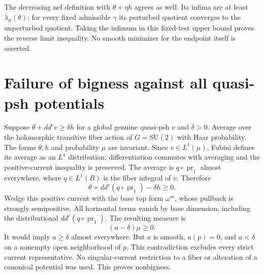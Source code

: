\documentclass[11pt]{article}
\newcommand{\ddc}{dd^c}
\theoremstyle{remark}\newtheorem{remark}[theorem]{Remark}
\begin{document}
The decreasing nef definition with $\theta+\eta h$ agrees as well.
Its infima are at least $\lambda_\mu(\theta)$; for every fixed admissible
$\gamma$ its perturbed quotient converges to the unperturbed quotient.
Taking the infimum in this fixed-test upper bound proves the reverse limit
inequality. No smooth minimizer for the endpoint itself is asserted.

\section{Failure of bigness against all quasi-psh potentials}
Suppose $\theta+\ddc v\geq\delta h$ for a global genuine quasi-psh $v$
and $\delta>0$. Average over the holomorphic transitive fiber action
of $G=\mathrm{SU}(2)$ with Haar probability. The forms $\theta,h$ and
probability $\mu$ are invariant. Since $v\in L^1(\mu)$, Fubini defines
its average as an $L^1$ distribution; differentiation commutes with averaging
and the positive-current inequality is preserved.
The average is $q\circ\operatorname{pr}_1$ almost everywhere, where
$q\in L^1(B)$ is the fiber integral of $v$. Therefore
\[
 \theta+\ddc(q\circ\operatorname{pr}_1)-\delta h\geq0.
\]
Wedge this positive current with the base top form $\omega^m$, whose
pullback is strongly semipositive. All horizontal terms vanish by base dimension, including the
distributional $\ddc(q\circ\operatorname{pr}_1)$. The resulting measure is
\[
 (a-\delta)\mu\geq0.
\]
It would imply $a\geq\delta$ almost everywhere. But $a$ is smooth,
$a(p)=0$, and $a<\delta$ on a nonempty open neighborhood of $p$.
This contradiction excludes every strict current representative.
No singular-current restriction to a fiber or alteration of a canonical
potential was used. This proves nonbigness.
\end{document}

